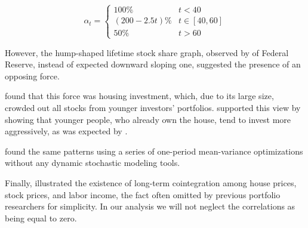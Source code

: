 \begin{equation}\label{eq:cgm}
	\alpha_t =
	\begin{cases}
		100\% 			& 	t<40\\
		(200-2.5t)\% 	& 	t\in[40,60]\\
		50\% 			& 	t>60
	\end{cases}
\end{equation}


However, the hump-shaped lifetime stock share graph, observed by \citet{chang} of Federal Reserve, instead of expected downward sloping one, suggested the presence of an opposing force.

\paraphraph{}\citet{cocco} found that this force was housing investment, which, due to its large size, crowded out all stocks from younger investors' portfolios. \citet{flavin} supported this view by showing that younger people, who already own the house, tend to invest more aggressively, as was expected by \citet{bodie}.

\paraphraph{}\citet{munk} found the same patterns using a series of one-period mean-variance optimizations without any dynamic stochastic modeling tools.

\paraphraph{}Finally, \citet{ascheberg} illustrated the existence of long-term cointegration among house prices, stock prices, and labor income, the fact often omitted by previous portfolio researchers for simplicity. In our analysis we will not neglect the correlations as being equal to zero. 
